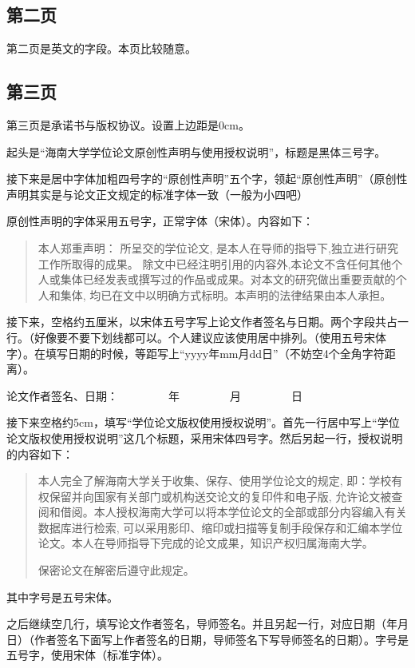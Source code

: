 \documentclass{hnuthesis}%
\begin{document}
\subsection{第二页}

第二页是英文的字段。本页比较随意。


\subsection{第三页}

第三页是承诺书与版权协议。设置上边距是0cm。

起头是“海南大学学位论文原创性声明与使用授权说明”，标题是黑体三号字。

接下来是居中字体加粗四号字的“原创性声明”五个字，领起“原创性声明”（原创性声明其实是与论文正文规定的标准字体一致（一般为小四吧）

原创性声明的字体采用五号字，正常字体（宋体）。内容如下：

\begin{quote}
本人郑重声明： 所呈交的学位论文, 是本人在导师的指导下,独立进行研究工作所取得的成果。 除文中已经注明引用的内容外,本论文不含任何其他个人或集体已经发表或撰写过的作品或成果。对本文的研究做出重要贡献的个人和集体, 均已在文中以明确方式标明。本声明的法律结果由本人承担。
\end{quote}

接下来，空格约五厘米，以宋体五号字写上论文作者签名与日期。两个字段共占一行。（好像要不要下划线都可以。个人建议应该使用居中排列。（使用五号宋体字）。在填写日期的时候，等距写上“yyyy年mm月dd日”（不妨空4个全角字符距离）。

论文作者签名、日期：~~~~~~~~~年~~~~~~~~~月~~~~~~~~~日


接下来空格约5cm，填写“学位论文版权使用授权说明”。首先一行居中写上“学位论文版权使用授权说明”这几个标题，采用宋体四号字。然后另起一行，授权说明的内容如下：

\begin{quote}
本人完全了解海南大学关于收集、保存、使用学位论文的规定, 即：学校有权保留并向国家有关部门或机构送交论文的复印件和电子版, 允许论文被查阅和借阅。本人授权海南大学可以将本学位论文的全部或部分内容编入有关数据库进行检索, 可以采用影印、缩印或扫描等复制手段保存和汇编本学位论文。本人在导师指导下完成的论文成果，知识产权归属海南大学。

保密论文在解密后遵守此规定。
\end{quote}

其中字号是五号宋体。

之后继续空几行，填写论文作者签名，导师签名。并且另起一行，对应日期（年月日）（作者签名下面写上作者签名的日期，导师签名下写导师签名的日期）。字号是五号字，使用宋体（标准字体）。
\end{document}
